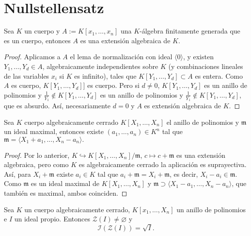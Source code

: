 \documentclass[../main.tex]{subfiles}
\begin{document}
\section{Nullstellensatz}
\begin{theorem}
	Sea $K$ un cuerpo y $A:=K[x_1,\dots,x_n]$ una $K$-álgebra finitamente generada que es un cuerpo, entonces $A$ es una extensión algebraica de $K.$
\end{theorem}

\begin{proof}Aplicamos a $A$ el lema de normalización con ideal $\langle 0\rangle$, y existen $Y_1,\dots,Y_d\in A$, algebraicamente independientes sobre $K$ (y combinaciones lineales de las variables $x_i$ si $K$ es infinito), tales que $K[Y_1,\dots,Y_d]\subset A$ es entera. Como $A$ es cuerpo, $K[Y_1,\dots,Y_d]]$ es cuerpo. Pero si $d\neq 0$, $K[Y_1,\dots,Y_d]$ es un anillo de polinomios y $\frac{1}{Y_1}\notin K[Y_1,\dots,Y_d]$ es un anillo de polinomios y $\frac{1}{Y_1}\notin K[Y_1,\dots,Y_d]$, que es absurdo. Así, necesariamente $d=0$ y $A$ es extensión algebraica de $K.$
\end{proof}

\begin{theorem}
	Sea $K$ cuerpo algebraicamente cerrado $K[X_1,\dots,X_n]$ el anillo de polinomios y $\mathfrak{m}$ un ideal maximal, entonces existe $(a_1,\dots,a_n)\in K^n$ tal que $\mathfrak{m}=\langle X_1+a_1,\dots,X_n-a_n\rangle.$
\end{theorem}

\begin{proof}
	Por lo anterior, $K\hookrightarrow K[X_1,\dots,X_n]/\mathfrak{m}$, $c\mapsto c+\mathfrak{m}$ es una extensión algebraica, pero como $K$ es algebraicamente cerrado la aplicación es suprayectiva. Así, para $X_i+\mathfrak{m}$ existe $a_i\in K$ tal que $a_i+\mathfrak{m}=X_i+\mathfrak{m}$, es decir, $X_i-a_i\in\mathfrak{m}.$ Como $\mathfrak{m}$ es un ideal maximal de $K[X_1,\dots, X_n]$ y $\mathfrak{m}\supset\langle X_1-a_1,\dots, X_n-a_n\rangle$, que también es maximal, ambos coinciden.
\end{proof}

\begin{theorem}
	Sea $K$ un cuerpo algebraicamente cerrado, $K[x_1,\dots,X_n]$ un anillo de polinomios e $I$ un ideal propio. Entonces $\mathcal{Z}(I)\neq\varnothing$ y
	$$\mathcal{I}(\mathcal{Z}(I))=\sqrt{I}.$$
\end{theorem}
\end{document}
